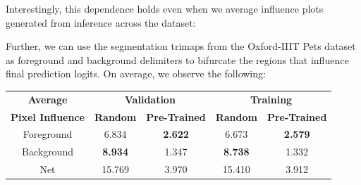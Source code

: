 \documentclass{article}
\theoremstyle{plain}
\theoremstyle{definition}
\theoremstyle{remark}
\begin{document}
Interestingly, this dependence holds even when we average influence plots generated from inference across the dataset:
\begin{figure}[h!]
	\centering
\end{figure}

Further, we can use the segmentation trimaps from the Oxford-IIIT Pets dataset as foreground and background delimiters to bifurcate the regions that influence final prediction logits. On average, we observe the following:

\begin{table}[h]
	\centering
	\begin{tabular}{c|cc|cc}
		\toprule
		\bf Average & \multicolumn{2}{c}{\bf Validation} & \multicolumn{2}{c}{\bf Training} \\
		\bf Pixel Influence & \textbf{Random} & \textbf{Pre-Trained} & \textbf{Random} & \textbf{Pre-Trained} \\
		\midrule
		Foreground & 6.834 & \bf 2.622 & 6.673 & \bf 2.579 \\
		Background & \bf 8.934 & 1.347 & \bf 8.738 & 1.332 \\
		\midrule
		Net & 15.769 & 3.970 & 15.410 & 3.912 \\
		\bottomrule
	\end{tabular}
\end{table}
\end{document}

